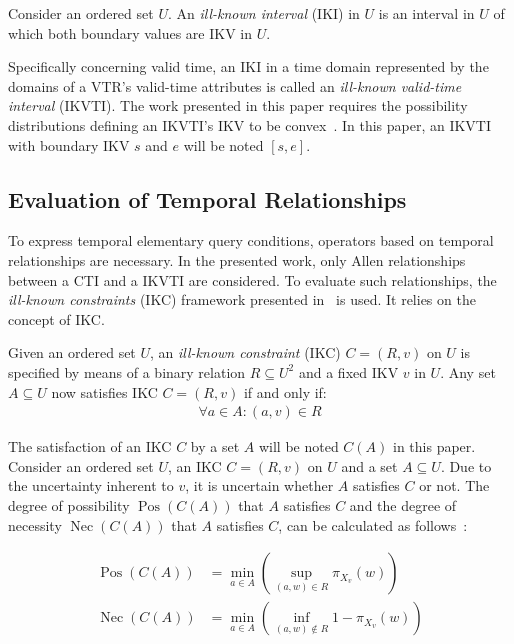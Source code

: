 \documentclass[runningheads,a4paper]{llncs}
\newcommand{\Pos}{\operatorname{Pos}}
\newcommand{\Nec}{\operatorname{Nec}}
\begin{document}
\begin{definition}
Consider an ordered set $U$. An \emph{ill-known interval} (IKI) in $U$ is an interval in $U$ of which both boundary values are IKV in $U$.
\end{definition}

Specifically concerning valid time, an IKI in a time domain represented by the domains of a VTR's valid-time attributes is called an \emph{ill-known valid-time interval} (IKVTI). The work presented in this paper requires the possibility distributions defining an IKVTI's IKV to be convex~\cite{Pons2013ijufkbs}. In this paper, an IKVTI with boundary IKV $s$ and $e$ will be noted $\left[s, e\right]$.

\subsection{Evaluation of Temporal Relationships}
To express temporal elementary query conditions, operators based on temporal relationships are necessary. In the presented work, only Allen relationships~\cite{Allen1983cacm} between a CTI and a IKVTI are considered. To evaluate such relationships, the \emph{ill-known constraints} (IKC) framework presented in~\cite{Pons2013ijufkbs} is used. It relies on the concept of IKC.

\begin{definition}
Given an ordered set $U$, an \emph{ill-known constraint} (IKC) $C = (R,v)$ on $U$ is specified by means of a binary relation $R \subseteq U^{2}$ and a fixed IKV $v$ in $U$. Any set $A \subseteq U$ now satisfies IKC $C = (R,v)$ if and only if:
\begin{align}
\forall a \in A : (a,v) \in R \nonumber
\end{align}
\end{definition}

The satisfaction of an IKC $C$ by a set $A$ will be noted $C(A)$ in this paper. Consider an ordered set $U$, an IKC $C = (R,v)$ on $U$ and a set $A \subseteq U$. Due to the uncertainty inherent to $v$, it is uncertain whether $A$ satisfies $C$ or not. The degree of possibility $\Pos(C(A))$ that $A$ satisfies $C$ and the degree of necessity $\Nec(C(A))$ that $A$ satisfies $C$, can be calculated as follows~\cite{Pons2013ijufkbs}:

\begin{align}
\Pos(C(A)) & = \min_{a \in A}\left(\sup_{(a,w) \in R}\pi_{X_{v}}(w)\right) \label{ill-known-pos}\\
\Nec(C(A)) & = \min_{a \in A}\left(\inf_{(a,w) \notin R} 1-\pi_{X_{v}}(w)\right) \label{ill-known-nec}
\end{align}
\end{document}
